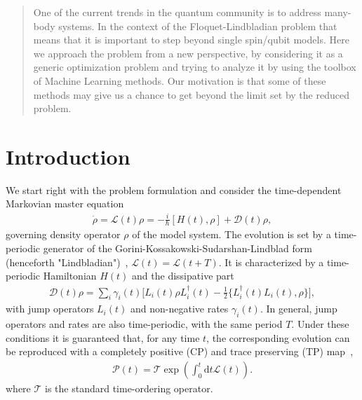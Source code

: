 \documentclass[%
 aip,
 floatfix,
 amsmath,amssymb,
 reprint,%
]{revtex4-1}
\begin{document}
\begin{quotation}
One of the current trends in the quantum community is to address many-body systems. In the context of the Floquet-Lindbladian problem that means that it is important to step beyond single spin/qubit models.  Here we approach the  problem from a new perspective, by considering it as a generic optimization problem and trying to analyze it by using the toolbox of Machine Learning methods. 
Our motivation is that some of these methods may give us a chance to get beyond the limit set by the reduced problem.
\end{quotation}


\section{Introduction\label{sec:1}}
We start right with the problem formulation and consider the time-dependent Markovian master equation \cite{Breuer2004,BreuerEtAl09}
\begin{align}
\label{eq:tdm}
\dot{\rho} = \mathcal{L}(t)\rho = -\frac{i}{\hbar}[H(t),\rho] + \mathcal{D}(t)\rho,
\end{align}
governing density operator $\rho$ of the model system. The evolution is set by a time-periodic
generator of the  Gorini-Kossakowski-Sudarshan-Lindblad form (henceforth "Lindbladian")~\cite{gorini,lindblad},
$\mathcal{L}(t)=\mathcal{L}(t+T)$. It is characterized by a  time-periodic
Hamiltonian $H(t)$ and the dissipative part 
\begin{align}
\mathcal{D}(t)\rho = 
\sum_i \gamma_i(t) \big[L_i(t)\rho L_i^\dag(t)-\frac{1}{2}\{L_i^\dag(t)L_i(t),\rho\}\big],
\end{align}
with jump operators $L_i(t)$ and non-negative rates $\gamma_i(t)$. In general, jump operators and rates are also time-periodic, with the same period $T$.
Under these conditions it is guaranteed that, for any time $t$, the corresponding  evolution can be reproduced  with a completely positive (CP) and trace preserving (TP) map~\cite{BreuerEtAl09},
\begin{align} 
\mathcal{P}(t)=\mathcal{T}\exp\left(\int_0^t\mathrm{d}t\mathcal{L}(t)\right).
\end{align}
where $\mathcal{T}$ is the standard time-ordering operator.
\end{document}
